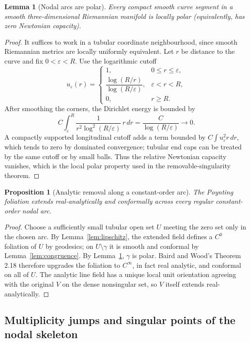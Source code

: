 \documentclass[aps,prd,reprint,nofootinbib,superscriptaddress]{revtex4-2}
\newtheorem{lemma}[theorem]{Lemma}
\newtheorem{proposition}[theorem]{Proposition}
\theoremstyle{definition}
\theoremstyle{remark}
\newcommand{\eps}{\varepsilon}
\begin{document}
\begin{lemma}[Nodal arcs are polar]
\label{lem:polar}
Every compact smooth curve segment in a smooth three-dimensional Riemannian manifold is locally polar (equivalently, has zero Newtonian capacity).
\end{lemma}

\begin{proof}
It suffices to work in a tubular coordinate neighbourhood, since smooth Riemannian metrics are locally uniformly equivalent. Let $r$ be distance to the curve and fix $0<\eps<R$. Use the logarithmic cutoff
\[
u_\eps(r)=\begin{cases}
1,&0\le r\le\eps,\\
\dfrac{\log(R/r)}{\log(R/\eps)},&\eps<r<R,\\
0,&r\ge R.
\end{cases}
\]
After smoothing the corners, the Dirichlet energy is bounded by
\[
C\int_\eps^R\frac{1}{r^2\log^2(R/\eps)}\,r\,dr
=\frac{C}{\log(R/\eps)}\longrightarrow0.
\]
A compactly supported longitudinal cutoff adds a term bounded by $C\int u_\eps^2 r\,dr$, which tends to zero by dominated convergence; tubular end caps can be treated by the same cutoff or by small balls. Thus the relative Newtonian capacity vanishes, which is the local polar property used in the removable-singularity theorem.
\end{proof}

\begin{proposition}[Analytic removal along a constant-order arc]
\label{prop:polarremove}
The Poynting foliation extends real-analytically and conformally across every regular constant-order nodal arc.
\end{proposition}

\begin{proof}
Choose a sufficiently small tubular open set $U$ meeting the zero set only in the chosen arc. By Lemma~\ref{lem:lipschitz}, the extended field defines a $C^0$ foliation of $U$ by geodesics; on $U\setminus\gamma$ it is smooth and conformal by Lemma~\ref{lem:congruence}. By Lemma~\ref{lem:polar}, $\gamma$ is polar. Baird and Wood's Theorem 2.18 \cite{BairdWood1991} therefore upgrades the foliation to $C^\infty$, in fact real analytic, and conformal on all of $U$. The analytic line field has a unique local unit orientation agreeing with the original $V$ on the dense nonsingular set, so $V$ itself extends real-analytically.
\end{proof}

\subsection{Multiplicity jumps and singular points of the nodal skeleton}
\end{document}
